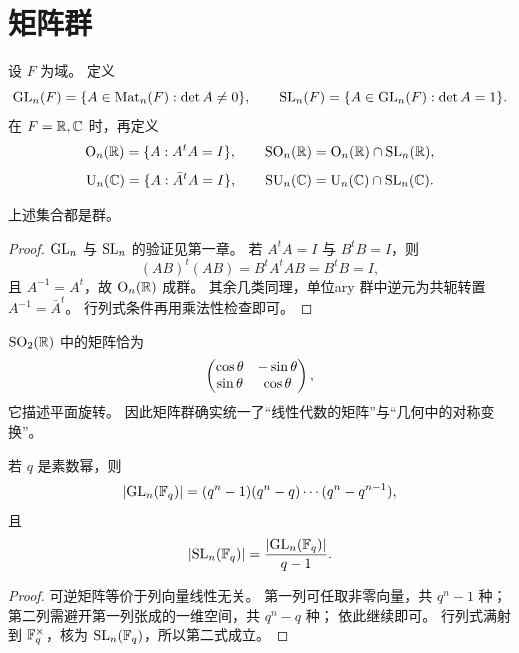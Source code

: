 \section{矩阵群}
\begin{definition}
设 $F$ 为域。
定义
\[
\mathrm{GL}_n(F)=\{A\in \mathrm{Mat}_n(F):\det A\ne0\},
\qquad
\mathrm{SL}_n(F)=\{A\in\mathrm{GL}_n(F):\det A=1\}.
\]
在 $F=\mathbb{R},\mathbb{C}$ 时，再定义
\[
\mathrm{O}_n(\mathbb{R})=\{A:A^tA=I\},\qquad
\mathrm{SO}_n(\mathbb{R})=\mathrm{O}_n(\mathbb{R})\cap \mathrm{SL}_n(\mathbb{R}),
\]
\[
\mathrm{U}_n(\mathbb{C})=\{A:\bar A^tA=I\},\qquad
\mathrm{SU}_n(\mathbb{C})=\mathrm{U}_n(\mathbb{C})\cap \mathrm{SL}_n(\mathbb{C}).
\]
\end{definition}
\begin{proposition}
上述集合都是群。
\end{proposition}
\begin{proof}
$\mathrm{GL}_n$ 与 $\mathrm{SL}_n$ 的验证见第一章。
若 $A^tA=I$ 与 $B^tB=I$，则
\[
(AB)^t(AB)=B^tA^tAB=B^tB=I,
\]
且 $A^{-1}=A^t$，故 $\mathrm{O}_n(\mathbb{R})$ 成群。
其余几类同理，单位ary 群中逆元为共轭转置 $A^{-1}=\bar A^t$。
行列式条件再用乘法性检查即可。
\end{proof}
\begin{example}
$\mathrm{SO}_2(\mathbb{R})$ 中的矩阵恰为
\[
\begin{pmatrix} \cos\theta&-\sin\theta\\ \sin\theta&\cos\theta \end{pmatrix},
\]
它描述平面旋转。
因此矩阵群确实统一了“线性代数的矩阵”与“几何中的对称变换”。
\end{example}
\begin{proposition}
若 $q$ 是素数幂，则
\[
|\mathrm{GL}_n(\mathbb{F}_q)|=(q^n-1)(q^n-q)\cdots(q^n-q^{n-1}),
\]
且
\[
|\mathrm{SL}_n(\mathbb{F}_q)|=\frac{|\mathrm{GL}_n(\mathbb{F}_q)|}{q-1}.
\]
\end{proposition}
\begin{proof}
可逆矩阵等价于列向量线性无关。
第一列可任取非零向量，共 $q^n-1$ 种；
第二列需避开第一列张成的一维空间，共 $q^n-q$ 种；
依此继续即可。
行列式满射到 $\mathbb{F}_q^\times$，核为 $\mathrm{SL}_n(\mathbb{F}_q)$，所以第二式成立。
\end{proof}
